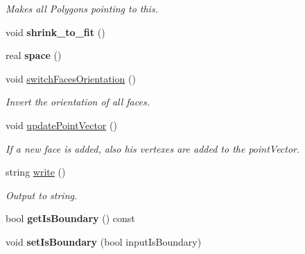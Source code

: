 \begin{DoxyCompactItemize}
\begin{DoxyCompactList}\small\item\em Makes all Polygons pointing to this. \end{DoxyCompactList}\item 
void {\bfseries shrink\+\_\+to\+\_\+fit} ()\hypertarget{class_polyhedron_a4972488920bf2dd7824175435829e475}{}\label{class_polyhedron_a4972488920bf2dd7824175435829e475}

\item 
real {\bfseries space} ()\hypertarget{class_polyhedron_a7b3f6b30e464fd1448d21cb43eb6f80c}{}\label{class_polyhedron_a7b3f6b30e464fd1448d21cb43eb6f80c}

\item 
void \hyperlink{class_polyhedron_a7d8f448cc9f8bbcf4a1e05ee4f8feb2f}{switch\+Faces\+Orientation} ()\hypertarget{class_polyhedron_a7d8f448cc9f8bbcf4a1e05ee4f8feb2f}{}\label{class_polyhedron_a7d8f448cc9f8bbcf4a1e05ee4f8feb2f}

\begin{DoxyCompactList}\small\item\em Invert the orientation of all faces. \end{DoxyCompactList}\item 
void \hyperlink{class_polyhedron_a609105d8805177c2d0e6d7298632a507}{update\+Point\+Vector} ()\hypertarget{class_polyhedron_a609105d8805177c2d0e6d7298632a507}{}\label{class_polyhedron_a609105d8805177c2d0e6d7298632a507}

\begin{DoxyCompactList}\small\item\em If a new face is added, also his vertexes are added to the point\+Vector. \end{DoxyCompactList}\item 
string \hyperlink{class_polyhedron_af611c2257de6a3a6a2f41a0c6c61e118}{write} ()
\begin{DoxyCompactList}\small\item\em Output to string. \end{DoxyCompactList}\item 
bool {\bfseries get\+Is\+Boundary} () const \hypertarget{class_polyhedron_acde3f89641eafdca70566d187f9b5ac7}{}\label{class_polyhedron_acde3f89641eafdca70566d187f9b5ac7}

\item 
void {\bfseries set\+Is\+Boundary} (bool input\+Is\+Boundary)\hypertarget{class_polyhedron_a71d09b5b7f19ef47e9518aa974e9c10c}{}\label{class_polyhedron_a71d09b5b7f19ef47e9518aa974e9c10c}


\end{DoxyCompactItemize}
